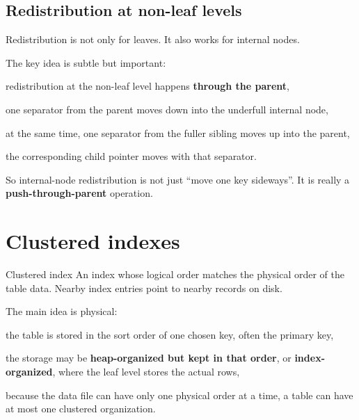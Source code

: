 \documentclass[../../dis.tex]{subfiles}
\begin{document}
\subsection{Redistribution at non-leaf levels}
Redistribution is not only for leaves. It also works for internal nodes.

\begin{schema}
{\resizebox{0.98\textwidth}{!}{}}\par}
\end{schema}

The key idea is subtle but important:
\begin{dashlist}
    \item redistribution at the non-leaf level happens \textbf{through the parent},
    \item one separator from the parent moves down into the underfull internal node,
    \item at the same time, one separator from the fuller sibling moves up into the parent,
    \item the corresponding child pointer moves with that separator.
\end{dashlist}

So internal-node redistribution is not just ``move one key sideways''. It is really a \textbf{push-through-parent} operation.

\newpage
\section{Clustered indexes}
\begin{concept}{Clustered index}
An index whose logical order matches the physical order of the table data. Nearby index entries point to nearby records on disk.
\end{concept}

The main idea is physical:
\begin{dashlist}
    \item the table is stored in the sort order of one chosen key, often the primary key,
    \item the storage may be \textbf{heap-organized but kept in that order}, or \textbf{index-organized}, where the leaf level stores the actual rows,
    \item because the data file can have only one physical order at a time, a table can have at most one clustered organization.
\end{dashlist}
\end{document}
